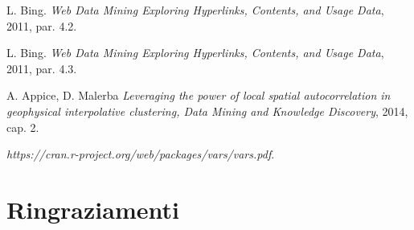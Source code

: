 \documentclass[12pt,a4paper,twoside,openright]{book}
\begin{document}
\begin{thebibliography}{1}
      L. Bing. {\em Web Data Mining Exploring Hyperlinks, Contents, and Usage Data}, 2011, par. 4.2.
     
      L. Bing. {\em Web Data Mining Exploring Hyperlinks, Contents, and Usage Data}, 2011, par. 4.3.
     
       A. Appice, D. Malerba {\em Leveraging the power of local spatial autocorrelation in geophysical interpolative clustering, Data Mining and Knowledge Discovery}, 2014, cap. 2.
          
      {\em https://cran.r-project.org/web/packages/vars/vars.pdf}.
      
  \end{thebibliography}
\chapter*{Ringraziamenti}
\end{document}
